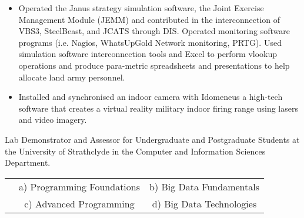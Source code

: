 {
{\begin{flushleft}
\begin{itemize}
  \item Operated the Janus strategy simulation software, the Joint Exercise Management Module (JEMM) and contributed in the interconnection of VBS3, SteelBeast, and JCATS through DIS. Operated monitoring software programs (i.e. Nagios, WhatsUpGold Network monitoring, PRTG). Used simulation software interconnection tools and Excel to perform vlookup operations and produce para-metric spreadsheets and presentations to help allocate land army personnel.
  \item Installed and synchronised an indoor camera with Idomeneus a high-tech software that creates a virtual reality military indoor firing range using lasers and video imagery.
\end{itemize} 
\end{flushleft} } } 

{
{\begin{flushleft}
Lab Demonstrator and Assessor for Undergraduate and Postgraduate Students at the University of Strathclyde in the Computer and Information Sciences Department. 
\begin{itemize}
\begin{tabular}{ccc}
& a)  \raggedleft Programming Foundations & b) Big Data Fundamentals\\
& c)  \raggedleft Advanced Programming & d) Big Data Technologies\\
\end{tabular}
\end{itemize}
\end{flushleft} } }

